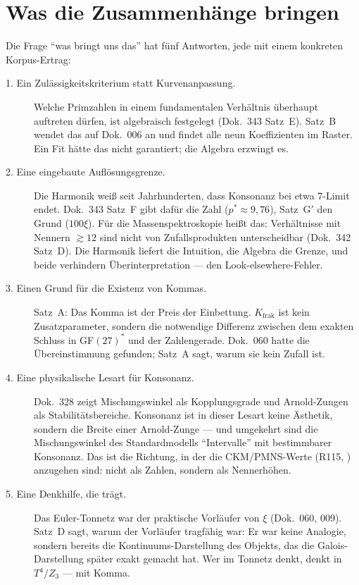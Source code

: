 \section{Was die Zusammenhänge bringen}

Die Frage ``was bringt uns das'' hat fünf Antworten, jede mit einem
konkreten Korpus-Ertrag:

\begin{description}

\item[1. Ein Zulässigkeitskriterium statt Kurvenanpassung.]
  Welche Primzahlen in einem fundamentalen Verhältnis überhaupt
  auftreten dürfen, ist algebraisch festgelegt (Dok.~343 Satz~E). Satz~B
  wendet das auf Dok.~006 an und findet alle neun Koeffizienten im
  Raster. Ein Fit hätte das nicht garantiert; die Algebra erzwingt es.

\item[2. Eine eingebaute Auflösungsgrenze.]
  Die Harmonik weiß seit Jahrhunderten, dass Konsonanz bei etwa 7-Limit
  endet. Dok.~343 Satz~F gibt dafür die Zahl ($p^*\approx9{,}76$), Satz~G$'$
  den Grund ($100\xi$). Für die Massenspektroskopie heißt das: Verhältnisse
  mit Nennern $\gtrsim12$ sind nicht von Zufallsprodukten unterscheidbar
  (Dok.~342 Satz~D). Die Harmonik liefert die Intuition, die Algebra die
  Grenze, und beide verhindern Überinterpretation --- den Look-elsewhere-Fehler.

\item[3. Einen Grund für die Existenz von Kommas.]
  Satz~A: Das Komma ist der Preis der Einbettung. $K_\text{frak}$ ist
  kein Zusatzparameter, sondern die notwendige Differenz zwischen dem
  exakten Schluss in GF$(27)^*$ und der Zahlengerade. Dok.~060 hatte die
  Übereinstimmung gefunden; Satz~A sagt, warum sie kein Zufall ist.

\item[4. Eine physikalische Lesart für Konsonanz.]
  Dok.~328 zeigt Mischungswinkel als Kopplungsgrade und Arnold-Zungen
  als Stabilitätsbereiche. Konsonanz ist in dieser Lesart keine
  Ästhetik, sondern die Breite einer Arnold-Zunge --- und umgekehrt sind
  die Mischungswinkel des Standardmodells ``Intervalle'' mit
  bestimmbarer Konsonanz. Das ist die Richtung, in der die CKM/PMNS-Werte
  (R115, \SM) anzugehen sind: nicht als Zahlen, sondern als Nennerhöhen.

\item[5. Eine Denkhilfe, die trägt.]
  Das Euler-Tonnetz war der praktische Vorläufer von $\xi$ (Dok.~060, 009).
  Satz~D sagt, warum der Vorläufer tragfähig war: Er war keine Analogie,
  sondern bereits die Kontinuums-Darstellung des Objekts, das die
  Galois-Darstellung später exakt gemacht hat. Wer im Tonnetz denkt,
  denkt in $T^4/Z_3$ --- mit Komma.

\end{description}

